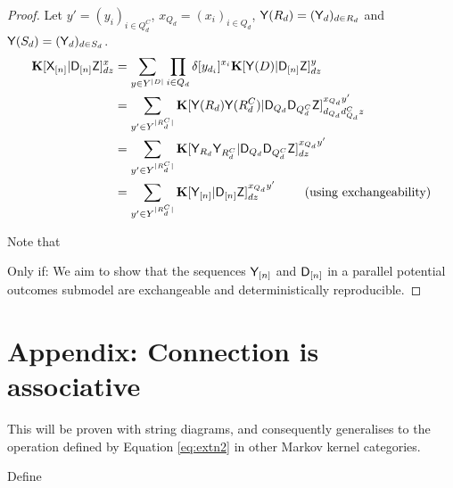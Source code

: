 \begin{proof}
Let $y'=(y_i)_{i\in Q_d^C}$, $x_{Q_d} = (x_i)_{i\in Q_d}$, $\mathsf{Y}(R_d)=(\mathsf{Y}_d)_{d\in R_d}$ and $\mathsf{Y}(S_d)=(\mathsf{Y}_d)_{d\in S_d}$.
\begin{align}
    \mathbf{K}[\mathsf{X}_{[n]}|\mathsf{D}_{[n]}\mathsf{Z}]^x_{dz} &= \sum_{y\in Y^{|D|}} \prod_{i\in Q_d} \delta[y_{d_i}]^{x_i} \mathbf{K}[\mathsf{Y}(D)|\mathsf{D}_{[n]}\mathsf{Z}]_{dz}^y\\
                                               &= \sum_{y'\in Y^{|R^C_d|}} \mathbf{K}[\mathsf{Y}(R_d)\mathsf{Y}(R^C_d)|\mathsf{D}_{Q_d}\mathsf{D}_{Q_d^C}\mathsf{Z}]_{d_{Q_d}d_{Q_d}^Cz}^{x_{Q_d}y'}\\
                                               &= \sum_{y'\in Y^{|R^C_d|}} \mathbf{K}[\mathsf{Y}_{R_d}\mathsf{Y}_{R^C_d}|\mathsf{D}_{Q_d}\mathsf{D}_{Q_d^C}\mathsf{Z}]_{dz}^{x_{Q_d}y'}\\
                                               &= \sum_{y'\in Y^{|R^C_d|}} \mathbf{K}[\mathsf{Y}_{[n]}|\mathsf{D}_{[n]}\mathsf{Z}]_{dz}^{x_{Q_d}y'}\qquad\text{ (using exchangeability})
\end{align}

Note that 



Only if:
We aim to show that the sequences $\mathsf{Y}_{[n]}$ and $\mathsf{D}_{[n]}$ in a parallel potential outcomes submodel are exchangeable and deterministically reproducible.
\end{proof}

\section{Appendix: Connection is associative}\label{sec:connect_associative}

This will be proven with string diagrams, and consequently generalises to the operation defined by Equation \ref{eq:extn2} in other Markov kernel categories.

Define

